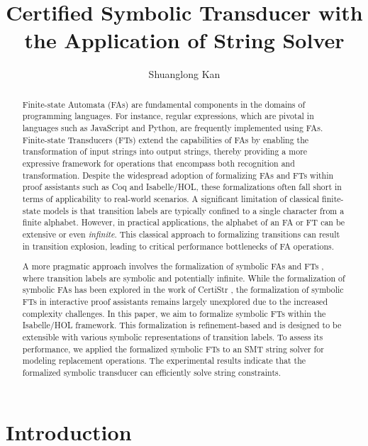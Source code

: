 \documentclass[a4paper,UKenglish,cleveref, autoref, anonymous, thm-restate]{lipics-v2021}
\title{Certified Symbolic Transducer with the Application of String Solver} %
\author{Shuanglong Kan}{Barkhausen Institut, Germany \and \url{https://github.com/ShlKan} }{shuanglongkan@gmail.com}{https://orcid.org/0000-0002-1825-0097}{(Optional) author-specific funding acknowledgements}%
\begin{document}
\maketitle

\begin{abstract}
Finite-state Automata (FAs) are fundamental components in the domains of programming languages. For instance, regular expressions, which are pivotal in languages such as JavaScript and Python, are frequently implemented using FAs.
%
Finite-state Transducers (FTs) extend the capabilities of FAs by enabling the transformation of input strings into output strings, thereby providing a more expressive framework for operations that encompass both recognition and transformation. Despite the widespread adoption of formalizing FAs and FTs within proof assistants such as Coq and Isabelle/HOL, these formalizations often fall short in terms of applicability to real-world scenarios. A significant limitation of classical finite-state models is that transition labels are typically confined to a single character from a finite alphabet. However, in practical applications, the alphabet of an FA or FT can be extensive or even \emph{infinite}. This classical approach to formalizing transitions can result in transition explosion, leading to critical performance bottlenecks of FA operations.

A more pragmatic approach involves the formalization of symbolic FAs \cite{cav/DAntoniV17} and FTs \cite{VeanesHLMB12Transducer}, where transition labels are symbolic and potentially infinite. While the formalization of symbolic FAs has been explored in the work of CertiStr \cite{cpp/KanLRS22}, the formalization of symbolic FTs in interactive proof assistants remains largely unexplored due to the increased complexity challenges.
%
In this paper, we aim to formalize symbolic FTs within the Isabelle/HOL framework. This formalization is refinement-based and is designed to be extensible with various symbolic representations of transition labels. To assess its performance, we applied the formalized symbolic FTs to an SMT string solver for modeling replacement operations. The experimental results indicate that the formalized symbolic transducer can efficiently solve string constraints.


\end{abstract}

\section{Introduction}
\label{sec:introduction}
\end{document}
